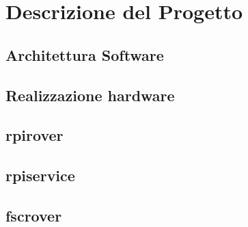 \chapter{Descrizione del Progetto}

\ifpdf
    \graphicspath{{Chapter3/Figs/Raster/}{Chapter3/Figs/PDF/}{Chapter3/Figs/}}
\else
    \graphicspath{{Chapter3/Figs/Vector/}{Chapter3/Figs/}}
\fi

\section{Architettura Software}
 
 

\section{Realizzazione hardware}

\section{rpirover}
 
\section{rpiservice}

\section{fscrover}

